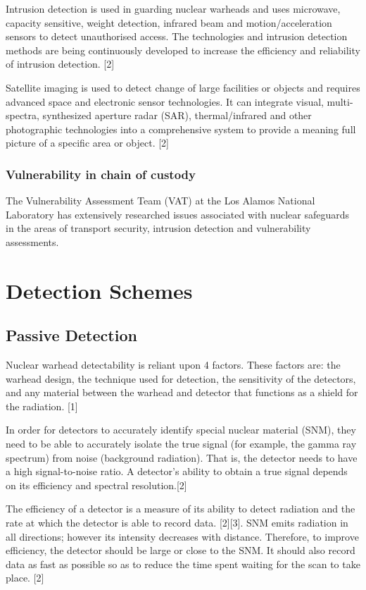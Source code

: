 \documentclass[twocolumn,a4paper]{article}
\begin{document}
Intrusion detection is used in guarding nuclear warheads and uses microwave, capacity sensitive,
weight detection, infrared beam and motion/acceleration sensors to detect unauthorised access.
The technologies and intrusion detection methods are being continuously developed to increase the
efficiency and reliability of intrusion detection. [2]

Satellite imaging is used to detect change of large facilities or objects and requires advanced space
and electronic sensor technologies. It can integrate visual, multi-spectra, synthesized aperture radar
(SAR), thermal/infrared and other photographic technologies into a comprehensive system to
provide a meaning full picture of a specific area or object. [2]

\subsubsection{Vulnerability in chain of custody}
The Vulnerability Assessment Team (VAT) at the Los Alamos National Laboratory has extensively
researched issues associated with nuclear safeguards in the areas of transport security, intrusion
detection and vulnerability assessments.

\section{Detection Schemes}
\subsection{Passive Detection}

Nuclear warhead detectability is reliant upon 4 factors. These factors are: the warhead
design, the technique used for detection, the sensitivity of the detectors, and any material
between the warhead and detector that functions as a shield for the radiation. [1]

In order for detectors to accurately identify special nuclear material (SNM), they need to
be able to accurately isolate the true signal (for example, the gamma ray spectrum) from noise
(background radiation). That is, the detector needs to have a high signal-to-noise ratio. A
detector’s ability to obtain a true signal depends on its efficiency and spectral resolution.[2]

The efficiency of a detector is a measure of its ability to detect radiation and the rate at
which the detector is able to record data. [2][3]. SNM emits radiation in all directions; however
its intensity decreases with distance. Therefore, to improve efficiency, the detector should be
large or close to the SNM. It should also record data as fast as possible so as to reduce the time
spent waiting for the scan to take place. [2]
\end{document}
